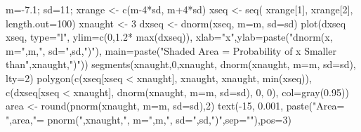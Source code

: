 \begin{Schunk}
\begin{Sinput}
  m=-7.1; sd=11;
  xrange <- c(m-4*sd, m+4*sd)
  xseq <- seq( xrange[1], xrange[2], length.out=100)
  xnaught <- 3
  dxseq <- dnorm(xseq, m=m, sd=sd)
  plot(dxseq ~ xseq, type="l", ylim=c(0,1.2* max(dxseq)), xlab="x",ylab=paste("dnorm(x, m=",m,", sd=",sd,")"), main=paste("Shaded Area = Probability of x Smaller than",xnaught,")"))
  segments(xnaught,0,xnaught, dnorm(xnaught, m=m, sd=sd), lty=2)
  polygon(c(xseq[xseq < xnaught], xnaught, xnaught, min(xseq)), c(dxseq[xseq < xnaught], dnorm(xnaught, m=m, sd=sd), 0, 0), col=gray(0.95))
  area <- round(pnorm(xnaught, m=m, sd=sd),2)
  text(-15, 0.001, paste("Area= ",area,"= \n pnorm(",xnaught,", m=",m,", sd=",sd,")",sep=""),pos=3)
\end{Sinput}
\end{Schunk}
